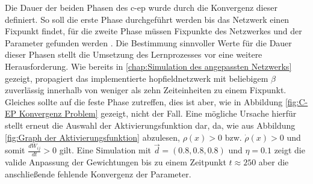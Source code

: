 Die Dauer der beiden Phasen des \gls{c-ep} wurde durch die Konvergenz dieser definiert. So soll die erste Phase durchgeführt werden bis das Netzwerk einen Fixpunkt findet, für die zweite Phase müssen Fixpunkte des Netzwerkes und der Parameter gefunden werden \cite[vgl. S. 3]{Ernoult2020}. Die Bestimmung sinnvoller Werte für die Dauer dieser Phasen stellt die Umsetzung des Lernprozesses vor eine weitere Herausforderung. Wie bereits in \ref{chap:Simulation des angepassten Netzwerks} gezeigt, propagiert das implementierte \gls{hopfieldnetzwerk} mit beliebigem \(\beta\) zuverlässig innerhalb von weniger als zehn Zeiteinheiten zu einem Fixpunkt. Gleiches sollte auf die feste Phase zutreffen, dies ist aber, wie in Abbildung \ref{fig:C-EP Konvergenz Problem} gezeigt, nicht der Fall. Eine mögliche Ursache hierfür stellt erneut die Auswahl der Aktivierungsfunktion dar, da, wie aus Abbildung \ref{fig:Graph der Aktivierungsfunktion} abzulesen, \(\rho(x) > 0\) bzw. \(\dot{\rho}(x) > 0\) und somit \(\frac{dW_{ij}}{dt} > 0\) gilt. Eine Simulation mit \(\vec{d}=(0.8,0.8,0.8)\) und \(\eta=0.1\) zeigt die valide Anpassung der Gewichtungen bis zu einem Zeitpunkt \(t\approx250\) aber die anschließende fehlende Konvergenz der Parameter.

